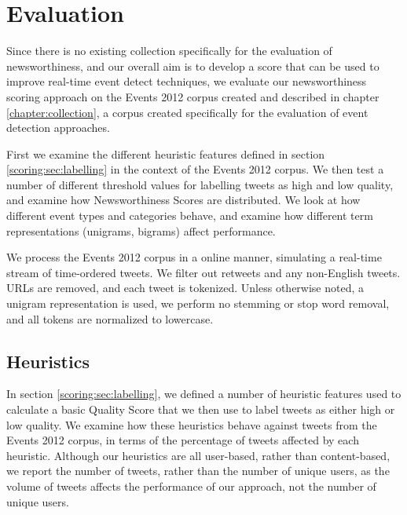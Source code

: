 
\section{Evaluation}
\label{scoring:sec:eval}

Since there is no existing collection specifically for the evaluation of newsworthiness, and our overall aim is to develop a score that can be used to improve real-time event detect techniques, we evaluate our newsworthiness scoring approach on the Events 2012 corpus created and described in chapter \ref{chapter:collection}, a corpus created specifically for the evaluation of event detection approaches.

First we examine the different heuristic features defined in section \ref{scoring:sec:labelling} in the context of the Events 2012 corpus.
We then test a number of different threshold values for labelling tweets as high and low quality, and examine how Newsworthiness Scores are distributed.
We look at how different event types and categories behave, and examine how different term representations (unigrams, bigrams)  affect performance.

We process the Events 2012 corpus in a online manner, simulating a real-time stream of time-ordered tweets.
We filter out retweets and any non-English tweets. URLs are removed, and each tweet is tokenized. Unless otherwise noted, a unigram representation is used, we perform no stemming or stop word removal, and all tokens are normalized to lowercase.

\subsection{Heuristics}
In section \ref{scoring:sec:labelling}, we defined a number of heuristic features used to calculate a basic Quality Score that we then use to label tweets as either high or low quality.
We examine how these heuristics behave against tweets from the Events 2012 corpus, in terms of the percentage of tweets affected by each heuristic.
Although our heuristics are all user-based, rather than content-based, we report the number of tweets, rather than the number of unique users, as the volume of tweets affects the performance of our approach, not the number of unique users.

